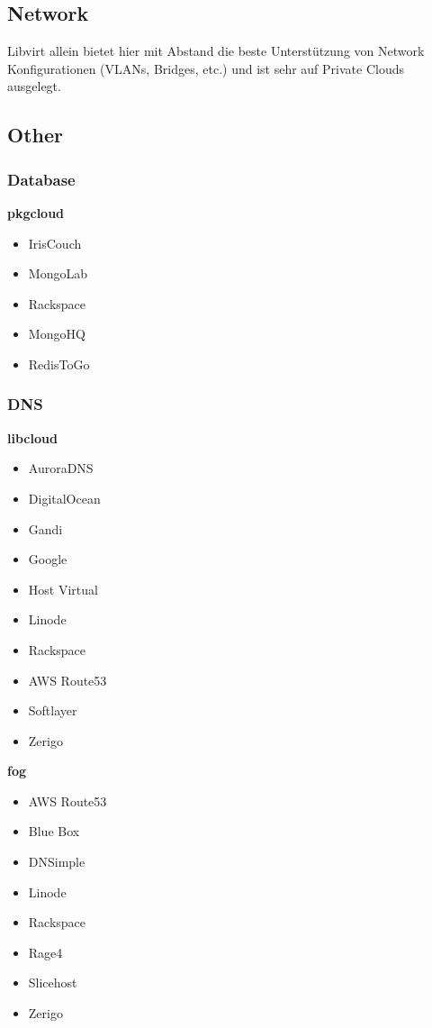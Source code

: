 \documentclass[11pt]{scrartcl}
\begin{document}
\subsection{Network}
Libvirt allein bietet hier mit Abstand die beste Unterstützung von Network Konfigurationen 
(VLANs, Bridges, etc.) und ist sehr auf Private Clouds ausgelegt.\\


\subsection{Other}
\subsubsection{Database}
\textbf{pkgcloud}
\begin{itemize}
\item IrisCouch
\item MongoLab
\item Rackspace
\item MongoHQ
\item RedisToGo
\end{itemize}

\subsubsection{DNS}
\textbf{libcloud}
\begin{itemize}
\item AuroraDNS
\item DigitalOcean
\item Gandi
\item Google
\item Host Virtual
\item Linode
\item Rackspace
\item AWS Route53
\item Softlayer
\item Zerigo
\end{itemize}

\textbf{fog}
\begin{itemize}
\item AWS Route53
\item Blue Box
\item DNSimple
\item Linode
\item Rackspace
\item Rage4
\item Slicehost
\item Zerigo
\end{itemize}
\end{document}
